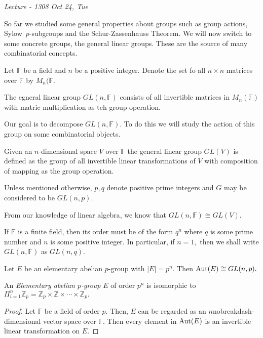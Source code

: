 
\noindent
\emph{Lecture - 13\hfill 08 Oct 24, Tue}

So far we studied some general properties about groups such as group actions, Sylow~$p$\nobreakdash-subgroups and the Schur\nobreakdash-Zassenhauss Theorem. We will now switch to some concrete groups, the general linear groups. These are the source of many combinatorial concepts.

Let $\mathbb{F}$ be a field and $n$ be a positive integer. Denote
the set fo all $n \times n$ matrices over $\mathbb{F}$ by $M_n(\mathbb{F}.$

\begin{definition}
	The egneral linear group $GL(n, \mathbb{F})$ consists of all
	invertible matrices in $M_n(\mathbb{F})$ with matric multiplication as teh group operation.
\end{definition}

Our goal is to decompose $GL(n, \mathbb{F}).$ To do this we will study the action of this group on some combinatorial objects.

\begin{remark}
	Given an $n$\nobreakdash-dimensional space $V$ over $\mathbb{F}$ the general linear group $GL(V)$ is defined as the group of all invertible linear transformations of $V$ with composition of mapping as the group operation.
\end{remark}

Unless mentioned otherwise, $p,q$ denote positive prime integers and
$G$ may be considered to be $GL(n,p).$

From our knowledge of linear algebra, we know that $GL(n, \mathbb{F}) \cong GL(V).$

If $\mathbb{F}$ is a finite field, then its order must be of the form $q^n$ where $q$ is some prime number and $n$ is some positive integer. In particular, if $n=1,$ then we shall write $GL(n, \mathbb{F})$ as $GL(n, q).$

\begin{proposition}
Let $E$ be an elementary abelian $p$\nobreakdash-group with $ \lvert E \rvert = p^n.$ Then $\operatorname{Aut}(E) \cong GL(n,p).$
\end{proposition}
An \emph{Elementary abelian $p$\nobreakdash-group} $E$ of order $p^n$ is isomorphic to $\Pi_{i=1}^{n} \mathbb{Z}_p = \mathbb{Z}_p \times \mathbb{Z} \times \cdots \times \mathbb{Z}_p.$
\begin{proof}
Let $\mathbb{F}$ be a field of order $p.$ Then, $E$ can be regarded as an $n$nobreakdash-dimensional vector space over $\mathbb{F}.$ Then every element in $\operatorname{Aut}(E)$ is an invertible linear transformation on $E.$
\end{proof}

